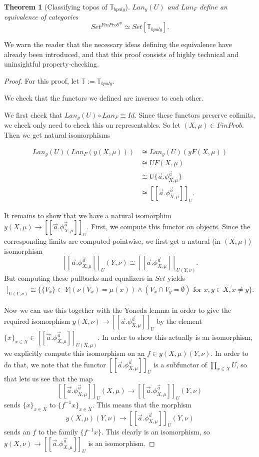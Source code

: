 \documentclass[a4paper]{amsproc}
\theoremstyle{plain}
\newtheorem{theorem}{Theorem}[section]
\theoremstyle{definition}
\theoremstyle{remark}
\numberwithin{equation}{section}
\newcommand{\ldoub}{[\![ }
\newcommand{\rdoub}{]\!]}
\begin{document}
\begin{theorem}[Classifying topos of $\mathbb{T}_{bpalg}$] \label{classifying_presheaf}
$Lan_y(U)$ and $Lan_F$ define an equivalence of categories
\[
Set^{FinProb^{op}} \simeq Set[\mathbb{T}_{bpalg}].
\]
\end{theorem}

We warn the reader that the necessary ideas defining the equivalence have already been introduced, and that this proof consists of highly technical and uninsightful property-checking.

\begin{proof}
For this proof, let $\mathbb{T} := \mathbb{T}_{bpalg}$.

We check that the functors we defined are inverses to each other.

We first check that $Lan_y(U) \circ Lan_F \cong Id$. Since these functors preserve colimits, we check only need to check this on representables. So let $(X,\mu) \in FinProb$. Then we get natural isomorphisms

\begin{align*}
Lan_y(U)(Lan_F(y(X,\mu))) &\cong Lan_y(U)(yF(X,\mu)) \\
&\cong UF(X,\mu) \\
&\cong U \{\vec{a} . \phi^{\vec{a}}_{X,\mu}\} \\
&\cong \ldoub \vec{a} . \phi^{\vec{a}}_{X,\mu} \rdoub_U .
\end{align*}

It remains to show that we have a natural isomorphim $y (X,\mu) \to \ldoub \vec{a} . \phi^{\vec{a}}_{X,\mu} \rdoub_U$. First, we compute this functor on objects. Since the corresponding limits are computed pointwise, we first get a natural (in $(X,\mu)$) isomorphism
\[
\ldoub \vec{a} . \phi^{\vec{a}}_{X,\mu} \rdoub_U (Y,\nu) \cong \ldoub \vec{a} . \phi^{\vec{a}}_{X,\mu} \rdoub_{U(Y,\nu)} .
\]
But computing these pullbacks and equalizers in $Set$ yields
\begin{align*}
\ldoub \vec{a} . \phi^{\vec{a}}_{X,\mu} \rdoub_{U(Y,\nu)} \cong
\{\{V_x\} \subset Y | (\nu(V_x) = \mu(x)) \wedge (V_x \cap V_y = \emptyset) \text{ for } x,y \in X, x \neq y\} .
\end{align*}

Now we can use this together with the Yoneda lemma in order to give the required isomorphism $y (X,\nu) \to \ldoub \vec{a} . \phi^{\vec{a}}_{X,\mu} \rdoub_U$ by the element $\{x\}_{x \in X} \in \ldoub \vec{a} . \phi^{\vec{a}}_{X,\mu} \rdoub_{U(X,\mu)}$. In order to show this actually is an isomorphism, we explicitly compute this isomorphism on an $f \in y (X,\mu) (Y,\nu)$. In order to do that, we note that the functor $\ldoub \vec{a} . \phi^{\vec{a}}_{X,\mu} \rdoub_U$ is a subfunctor of $\prod_{x \in X} U$, so that lets us see that the map
\[
\ldoub \vec{a} . \phi^{\vec{a}}_{X,\mu} \rdoub_U(X,\mu) \to \ldoub \vec{a} . \phi^{\vec{a}}_{X,\mu} \rdoub_U(Y,\nu)
\]
sends $\{x\}_{x \in X}$ to $\{f^{-1} x\}_{x \in X}$. This means that the morphism
\[
y (X,\mu) (Y,\nu) \to \ldoub \vec{a} . \phi^{\vec{a}}_{X,\mu} \rdoub_U(Y,\nu)
\]
sends an $f$ to the family $\{f^{-1} x\}$. This clearly is an isomorphism, so $y (X,\nu) \to \ldoub \vec{a} . \phi^{\vec{a}}_{X,\mu} \rdoub_U$ is an isomorphism.


\end{proof}
\end{document}
